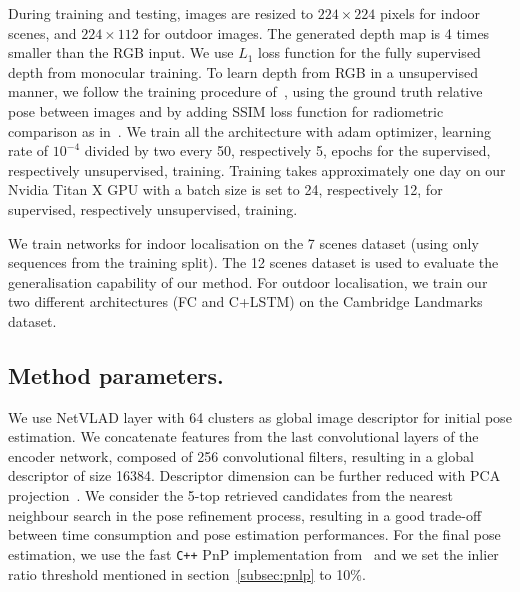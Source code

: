 During training and testing, images are resized to $224 \times 224$ pixels for indoor scenes, and $224 \times 112$ for outdoor images. The generated depth map is 4 times smaller than the RGB input. We use $L_1$ loss function for the fully supervised depth from monocular training. To learn depth from RGB in a unsupervised manner, we follow the training procedure of~\citep{Zhou2017a}, using the ground truth relative pose between images and by adding SSIM loss function for radiometric comparison as in~\citep{Mahjourian2018}. We train all the architecture with adam optimizer, learning rate of $10^{-4}$ divided by two every 50, respectively 5, epochs for the supervised, respectively unsupervised, training. Training takes approximately one day on our Nvidia Titan X GPU with a batch size is set to 24, respectively 12, for supervised, respectively unsupervised, training.

We train networks for indoor localisation on the 7 scenes dataset (using only sequences from the training split). The 12 scenes dataset is used to evaluate the generalisation capability of our method. For outdoor localisation, we train our two different architectures (FC and C+LSTM) on the Cambridge Landmarks dataset.

\subsection{Method parameters.} We use NetVLAD layer with 64 clusters as global image descriptor for initial pose estimation. We concatenate features from the last convolutional layers of the encoder network, composed of 256 convolutional filters, resulting in a global descriptor of size 16384. Descriptor dimension can be further reduced with PCA projection~\citep{Arandjelovic2017}. We consider the 5-top retrieved candidates from the nearest neighbour search in the pose refinement process, resulting in a good trade-off between time consumption and pose estimation performances. For the final pose estimation, we use the fast \texttt{C++} PnP implementation from~\citep{Kneip2014opengv} and we set the inlier ratio threshold mentioned in section~\ref{subsec:pnlp} to 10\%.



